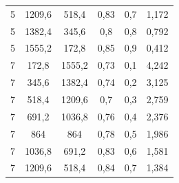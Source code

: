 \begin{table}[H]
\begin{tabular}{|c|c|c|c|c|c|}
					5          & 1209,6                                                                         & 518,4                                                                 & 0,83               & 0,7            & 1,172             \\
					5          & 1382,4                                                                         & 345,6                                                                 & 0,8                & 0,8            & 0,792             \\
					5          & 1555,2                                                                         & 172,8                                                                 & 0,85               & 0,9            & 0,412             \\
					7          & 172,8                                                                          & 1555,2                                                                & 0,73               & 0,1            & 4,242             \\
					7          & 345,6                                                                          & 1382,4                                                                & 0,74               & 0,2            & 3,125             \\
					7          & 518,4                                                                          & 1209,6                                                                & 0,7                & 0,3            & 2,759             \\
					7          & 691,2                                                                          & 1036,8                                                                & 0,76               & 0,4            & 2,376             \\
					7          & 864                                                                            & 864                                                                   & 0,78               & 0,5            & 1,986             \\
					7          & 1036,8                                                                         & 691,2                                                                 & 0,83               & 0,6            & 1,581             \\
					7          & 1209,6                                                                         & 518,4                                                                 & 0,84               & 0,7            & 1,384             \\

\end{tabular}
\end{table}
